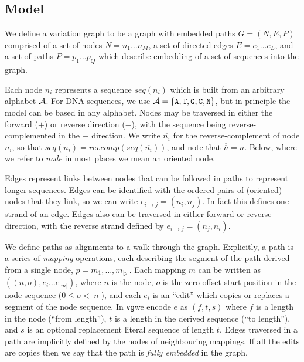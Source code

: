 \documentclass[12pt]{article}
\newcommand{\vg}{{\tt vg}}
\begin{document}
\subsection{Model}

We define a variation graph to be a graph with embedded paths $G = ( N, E, P )$ comprised of
a set of nodes $N = n_1 \ldots n_M$,
a set of directed edges $E = e_1 \ldots e_L$,
and a set of paths $P = p_1 \ldots p_Q$ which describe embedding of a set of sequences into the graph.

Each node $n_i$ represents a sequence $seq(n_i)$ which is built from an arbitrary alphabet ${ \cal A }$.
For DNA sequences, we use ${ \cal A } = \{ {\tt A, T, G, C, N} \}$, but in principle the model can be based in any alphabet.
Nodes may be traversed in either the forward ($+$) or reverse direction ($-$), with the sequence being reverse-complemented in the
$-$ direction.  
We write $\overline{n_i}$ for the reverse-complement of node $n_i$, so that $seq(n_i) = revcomp(seq(\overline{n_i}))$, and note
that $\overline{\overline{n}} = n$.  Below, where we refer to {\em node} in most places we mean an oriented node. 

Edges represent links between nodes that can be followed in paths to represent longer sequences.
Edges can be identified with the ordered pairs of (oriented) nodes that they link, so we can write
$e_{i \rightarrow j} = ( n_i, n_j ) $.  In fact this defines one strand of an edge.  Edges also can be traversed in either forward or
reverse direction, with the reverse strand defined by $\overline{e_{i \rightarrow j}} = (  \overline{n_j}, \overline{n_i} )$.

We define paths as alignments to a walk through the graph.  Explicitly, a path is a series of {\em mapping} operations, each
describing the segment of the path derived from a single node, $p = m_1, \ldots, m_{|p|}$.  Each mapping $m$ can be written
as $( (n, o), e_i \ldots e_{|m|} )$, where $n$ is the node, $o$ is the zero-offset start position in the node sequence ($0 \le o < |n|$),
and each $e_i$ is an ``edit'' which copies or replaces a segment of the node sequence.  In \vg we encode $e$ as $(f, t, s)$
where $f$ is a length in the node (``from length''), $t$ is a length in the derived sequence (``to length''), and $s$ is an optional
replacement literal sequence of length $t$.  Edges traversed in a path are implicitly defined by the nodes of neighbouring mappings.
If all the edits are copies then we say that the path is {\em fully embedded} in the graph.
\end{document}
